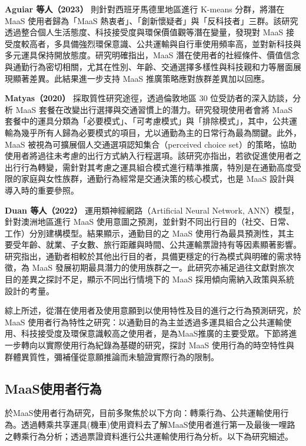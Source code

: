 \textbf{Aguiar 等人（2023）} 則針對西班牙馬德里地區進行 K-means
分群，將潛在 MaaS 使用者歸為「MaaS
熱衷者」、「創新懷疑者」與「反科技者」三群。該研究透過整合個人生活態度、科技接受度與環保價值觀等潛在變量，發現對
MaaS
接受度較高者，多具備強烈環保意識、公共運輸與自行車使用頻率高，並對新科技與多元運具保持開放態度。研究明確指出，MaaS
潛在使用者的社經條件、價值信念與通勤行為密切相關，尤其在性別、年齡、交通選擇多樣性與科技親和力等層面展現顯著差異。此結果進一步支持
MaaS 推廣策略應對族群差異加以回應。

\textbf{Matyas（2020）} 採取質性研究途徑，透過倫敦地區 30
位受訪者的深入訪談，分析 MaaS
套餐在改變出行選擇與交通習慣上的潛力。研究發現使用者會將 MaaS
套餐中的運具分類為「必要模式」、「可考慮模式」與「排除模式」，其中，公共運輸為幾乎所有人歸為必要模式的項目，尤以通勤為主的日常行為最為關鍵。此外，MaaS
被視為可擴展個人交通選項認知集合（perceived choice
set）的策略，協助使用者將過往未考慮的出行方式納入行程選項。該研究亦指出，若欲促進使用者之出行行為轉變，需針對其考慮之運具組合模式進行精準推廣，特別是在通勤高度受限的家庭與女性族群，通勤行為經常是交通決策的核心模式，也是
MaaS 設計與導入時的重要參照。

\textbf{Duan 等人（2022）} 運用類神經網路（Artificial Neural Network,
ANN）模型，針對澳洲地區進行 MaaS
使用意圖之預測，並針對不同出行目的（社交、日常、工作）分別建構模型。結果顯示，通勤目的之
MaaS
使用行為最具預測性，其主要受年齡、就業、子女數、旅行距離與時間、公共運輸票證持有等因素顯著影響。研究指出，通勤者相較於其他出行目的者，具備更穩定的行為模式與明確的需求特徵，為
MaaS
發展初期最具潛力的使用族群之一。此研究亦補足過往文獻對旅次目的差異之探討不足，顯示不同出行情境下的
MaaS 採用傾向需納入政策與系統設計的考量。

綜上所述，從潛在使用者及使用意願到以使用特性及目的進行之行為預測研究，於
MaaS
使用者行為特性之研究：以通勤目的為主並透過多運具組合之公共運輸使用、科技接受度及環保意識較高之使用者，是為MaaS推廣的主要受眾。下節將進一步轉向以實際使用行為紀錄為基礎的研究，探討
MaaS
使用行為的時空特性與群體異質性，彌補僅從意願推論而未驗證實際行為的限制。

\subsection{MaaS使用者行為}\label{maasux4f7fux7528ux8005ux884cux70ba}

於MaaS使用者行為研究，目前多聚焦於以下方向：轉乘行為、公共運輸使用行為。透過轉乘共享運具(機車)使用資料去了解MaaS使用者進行第一及最後一哩路之轉乘行為分析；透過票證資料進行公共運輸使用行為分析。以下為研究細述。

